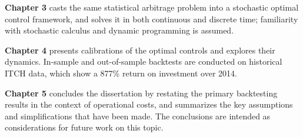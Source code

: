 {\bf Chapter 3} casts the same statistical arbitrage problem into a stochastic optimal control framework, and solves it in both continuous and discrete time; familiarity with stochastic calculus and dynamic programming is assumed. 

{\bf Chapter 4} presents calibrations of the optimal controls and explores their dynamics. In-sample and out-of-sample backtests are conducted on historical ITCH data, which show a 877\% return on investment over 2014.

{\bf Chapter 5} concludes the dissertation by restating the primary backtesting results in the context of operational costs, and summarizes the key assumptions and simplifications that have been made. The conclusions are intended as considerations for future work on this topic.